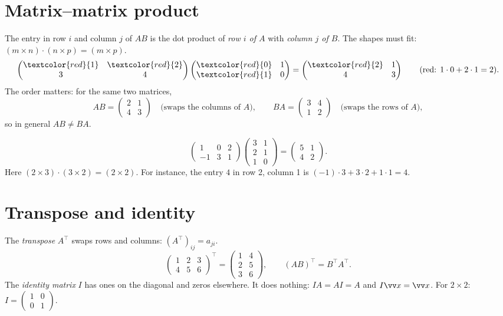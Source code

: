 \section*{Matrix--matrix product}
The entry in row $i$ and column $j$ of $AB$ is the dot product of \emph{row $i$ of $A$} with \emph{column $j$ of $B$}. The shapes must fit: $(m\times n)\cdot(n\times p)=(m\times p)$.
\[
\begin{pmatrix}\textcolor{red}{1}&\textcolor{red}{2}\\3&4\end{pmatrix}
\begin{pmatrix}\textcolor{red}{0}&1\\\textcolor{red}{1}&0\end{pmatrix}
=\begin{pmatrix}\textcolor{red}{2}&1\\4&3\end{pmatrix}
\qquad(\text{red: }1\cdot0+2\cdot1=2).
\]
The order matters: for the same two matrices,
\[
AB=\begin{pmatrix}2&1\\4&3\end{pmatrix}\quad\text{(swaps the columns of }A),\qquad
BA=\begin{pmatrix}3&4\\1&2\end{pmatrix}\quad\text{(swaps the rows of }A),
\]
so in general $AB\neq BA$.

\begin{example}
\[
\begin{pmatrix}1&0&2\\-1&3&1\end{pmatrix}\begin{pmatrix}3&1\\2&1\\1&0\end{pmatrix}
=\begin{pmatrix}5&1\\4&2\end{pmatrix}.
\]
Here $(2\times3)\cdot(3\times2)=(2\times2)$. For instance, the entry $4$ in row 2, column 1 is $(-1)\cdot3+3\cdot2+1\cdot1=4$.
\end{example}

\section*{Transpose and identity}
The \emph{transpose} $A^{\top}$ swaps rows and columns: $(A^\top)_{ij}=a_{ji}$.
\[
\begin{pmatrix}1&2&3\\4&5&6\end{pmatrix}^{\top}=\begin{pmatrix}1&4\\2&5\\3&6\end{pmatrix},\qquad
(AB)^\top=B^\top A^\top.
\]
The \emph{identity matrix} $I$ has ones on the diagonal and zeros elsewhere. It does nothing: $IA=AI=A$ and $I\vv x=\vv x$. For $2\times2$: $I=\begin{pmatrix}1&0\\0&1\end{pmatrix}$.

